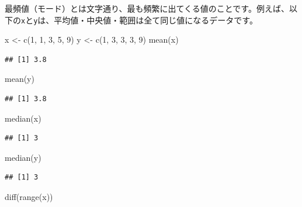 \documentclass[
  12pt,
]{book}
\newenvironment{Shaded}{\begin{snugshade}}{\end{snugshade}}
\newcommand{\DecValTok}[1]{\textcolor[rgb]{0.00,0.00,0.81}{#1}}
\newcommand{\FunctionTok}[1]{\textcolor[rgb]{0.00,0.00,0.00}{#1}}
\newcommand{\NormalTok}[1]{#1}
\newcommand{\OtherTok}[1]{\textcolor[rgb]{0.56,0.35,0.01}{#1}}
\begin{document}
最頻値（モード）とは文字通り、最も頻繁に出てくる値のことです。例えば、以下の\texttt{x}と\texttt{y}は、平均値・中央値・範囲は全て同じ値になるデータです。

\begin{Shaded}
\begin{Highlighting}[numbers=left,,]
\NormalTok{x }\OtherTok{\textless{}{-}} \FunctionTok{c}\NormalTok{(}\DecValTok{1}\NormalTok{, }\DecValTok{1}\NormalTok{, }\DecValTok{3}\NormalTok{, }\DecValTok{5}\NormalTok{, }\DecValTok{9}\NormalTok{)}
\NormalTok{y }\OtherTok{\textless{}{-}} \FunctionTok{c}\NormalTok{(}\DecValTok{1}\NormalTok{, }\DecValTok{3}\NormalTok{, }\DecValTok{3}\NormalTok{, }\DecValTok{3}\NormalTok{, }\DecValTok{9}\NormalTok{)}
\FunctionTok{mean}\NormalTok{(x)}
\end{Highlighting}
\end{Shaded}

\begin{verbatim}
## [1] 3.8
\end{verbatim}

\begin{Shaded}
\begin{Highlighting}[numbers=left,,]
\FunctionTok{mean}\NormalTok{(y)}
\end{Highlighting}
\end{Shaded}

\begin{verbatim}
## [1] 3.8
\end{verbatim}

\begin{Shaded}
\begin{Highlighting}[numbers=left,,]
\FunctionTok{median}\NormalTok{(x)}
\end{Highlighting}
\end{Shaded}

\begin{verbatim}
## [1] 3
\end{verbatim}

\begin{Shaded}
\begin{Highlighting}[numbers=left,,]
\FunctionTok{median}\NormalTok{(y)}
\end{Highlighting}
\end{Shaded}

\begin{verbatim}
## [1] 3
\end{verbatim}

\begin{Shaded}
\begin{Highlighting}[numbers=left,,]
\FunctionTok{diff}\NormalTok{(}\FunctionTok{range}\NormalTok{(x))}
\end{Highlighting}
\end{Shaded}
\end{document}
